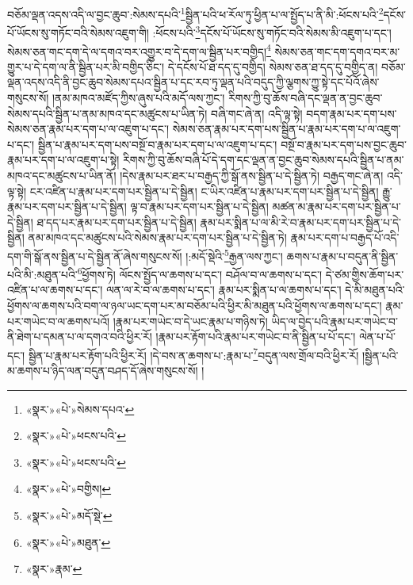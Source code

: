 བཅོམ་ལྡན་འདས་འདི་ལ་བྱང་ཆུབ་:སེམས་དཔའི་\footnote{«སྣར་»«པེ་»སེམས་དཔའ་}སྦྱིན་པའི་ཕ་རོལ་ཏུ་ཕྱིན་པ་ལ་སྤྱོད་པ་ནི་མི་:ཕོངས་པའི་\footnote{«སྣར་»«པེ་»ཕངས་པའི་}དངོས་པོ་ཡོངས་སུ་གཏོང་བའི་སེམས་འཇུག་གི། :ཕོངས་པའི་\footnote{«སྣར་»«པེ་»ཕངས་པའི་}དངོས་པོ་ཡོངས་སུ་གཏོང་བའི་སེམས་མི་འཇུག་པ་དང་། སེམས་ཅན་གང་དག་དེ་ལ་དགའ་བར་འགྱུར་བ་དེ་དག་ལ་སྦྱིན་པར་བགྱིད།\footnote{«སྣར་»«པེ་»བགྱིས།} སེམས་ཅན་གང་དག་དགའ་བར་མ་གྱུར་པ་དེ་དག་ལ་ནི་སྦྱིན་པར་མི་བགྱིད་ཅིང་། དེ་དངོས་པོ་ཐ་དད་དུ་བགྱིད། སེམས་ཅན་ཐ་དད་དུ་བགྱིད་ན། བཅོམ་ལྡན་འདས་འདི་ནི་བྱང་ཆུབ་སེམས་དཔའ་སྦྱིན་པ་དང་རབ་ཏུ་ལྡན་པའི་བདུད་ཀྱི་ལྕགས་ཀྱུ་སྟེ་དང་པོའོ་ཞེས་གསུངས་སོ། །ནམ་མཁའ་མཛོད་ཀྱིས་ཞུས་པའི་མདོ་ལས་ཀྱང་། རིགས་ཀྱི་བུ་ཆོས་བཞི་དང་ལྡན་ན་བྱང་ཆུབ་སེམས་དཔའི་སྦྱིན་པ་ནམ་མཁའ་དང་མཚུངས་པ་ཡིན་ཏེ། བཞི་གང་ཞེ་ན། འདི་ལྟ་སྟེ། བདག་རྣམ་པར་དག་པས་སེམས་ཅན་རྣམ་པར་དག་པ་ལ་འཇུག་པ་དང་། སེམས་ཅན་རྣམ་པར་དག་པས་སྦྱིན་པ་རྣམ་པར་དག་པ་ལ་འཇུག་པ་དང་། སྦྱིན་པ་རྣམ་པར་དག་པས་བསྔོ་བ་རྣམ་པར་དག་པ་ལ་འཇུག་པ་དང་། བསྔོ་བ་རྣམ་པར་དག་པས་བྱང་ཆུབ་རྣམ་པར་དག་པ་ལ་འཇུག་པ་སྟེ། རིགས་ཀྱི་བུ་ཆོས་བཞི་པོ་དེ་དག་དང་ལྡན་ན་བྱང་ཆུབ་སེམས་དཔའི་སྦྱིན་པ་ནམ་མཁའ་དང་མཚུངས་པ་ཡིན་ནོ། །དེས་རྣམ་པར་ཐར་པ་བརྒྱད་ཀྱི་སྒོ་ནས་སྦྱིན་པ་དེ་སྦྱིན་ཏེ། བརྒྱད་གང་ཞེ་ན། འདི་ལྟ་སྟེ། ངར་འཛིན་པ་རྣམ་པར་དག་པར་སྦྱིན་པ་དེ་སྦྱིན། ང་ཡིར་འཛིན་པ་རྣམ་པར་དག་པར་སྦྱིན་པ་དེ་སྦྱིན། རྒྱུ་རྣམ་པར་དག་པར་སྦྱིན་པ་དེ་སྦྱིན། ལྟ་བ་རྣམ་པར་དག་པར་སྦྱིན་པ་དེ་སྦྱིན། མཚན་མ་རྣམ་པར་དག་པར་སྦྱིན་པ་དེ་སྦྱིན། ཐ་དད་པར་རྣམ་པར་དག་པར་སྦྱིན་པ་དེ་སྦྱིན། རྣམ་པར་སྨིན་པ་ལ་མི་རེ་བ་རྣམ་པར་དག་པར་སྦྱིན་པ་དེ་སྦྱིན། ནམ་མཁའ་དང་མཚུངས་པའི་སེམས་རྣམ་པར་དག་པར་སྦྱིན་པ་དེ་སྦྱིན་ཏེ། རྣམ་པར་དག་པ་བརྒྱད་པོ་འདི་དག་གི་སྒོ་ནས་སྦྱིན་པ་དེ་སྦྱིན་ནོ་ཞེས་གསུངས་སོ། །:མདོ་སྡེའི་\footnote{«སྣར་»«པེ་»མདོ་སྡེ་}རྒྱན་ལས་ཀྱང་། ཆགས་པ་རྣམ་པ་བདུན་ནི་སྦྱིན་པའི་མི་:མཐུན་པའི་\footnote{«སྣར་»«པེ་»མཐུན་}ཕྱོགས་ཏེ། ལོངས་སྤྱོད་ལ་ཆགས་པ་དང་། བཤོལ་བ་ལ་ཆགས་པ་དང་། དེ་ཙམ་གྱིས་ཆོག་པར་འཛིན་པ་ལ་ཆགས་པ་དང་། ལན་ལ་རེ་བ་ལ་ཆགས་པ་དང་། རྣམ་པར་སྨིན་པ་ལ་ཆགས་པ་དང་། དེ་མི་མཐུན་པའི་ཕྱོགས་ལ་ཆགས་པའི་བག་ལ་ཉལ་ཡང་དག་པར་མ་བཅོམ་པའི་ཕྱིར་མི་མཐུན་པའི་ཕྱོགས་ལ་ཆགས་པ་དང་། རྣམ་པར་གཡེང་བ་ལ་ཆགས་པའོ། །རྣམ་པར་གཡེང་བ་དེ་ཡང་རྣམ་པ་གཉིས་ཏེ། ཡིད་ལ་བྱེད་པའི་རྣམ་པར་གཡེང་བ་ནི་ཐེག་པ་དམན་པ་ལ་དགའ་བའི་ཕྱིར་རོ། །རྣམ་པར་རྟོག་པའི་རྣམ་པར་གཡེང་བ་ནི་སྦྱིན་པ་པོ་དང་། ལེན་པ་པོ་དང་། སྦྱིན་པ་རྣམ་པར་རྟོག་པའི་ཕྱིར་རོ། །དེ་བས་ན་ཆགས་པ་:རྣམ་པ་\footnote{«སྣར་»རྣམ་}བདུན་ལས་གྲོལ་བའི་ཕྱིར་རོ། །སྦྱིན་པའི་མ་ཆགས་པ་ཉིད་ལན་བདུན་བཤད་དོ་ཞེས་གསུངས་སོ། །
